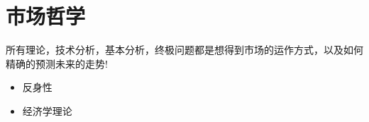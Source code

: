 \chapter{市场哲学}


所有理论，技术分析，基本分析，终极问题都是想得到市场的运作方式，以及如何精确的预测未来的走势!

\begin{itemize}
\item 反身性
\item 经济学理论


\end{itemize}
